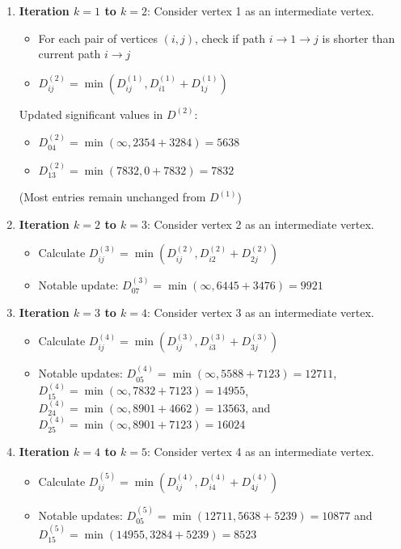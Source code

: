 \documentclass{article}
\theoremstyle{definition}
\begin{document}
\begin{enumerate}
\item \textbf{Iteration $k=1$ to $k=2$}: Consider vertex 1 as an intermediate vertex.
   \begin{itemize}
   \item For each pair of vertices $(i,j)$, check if path $i \rightarrow 1 \rightarrow j$ is shorter than current path $i \rightarrow j$
   \item $D^{(2)}_{ij} = \min(D^{(1)}_{ij}, D^{(1)}_{i1} + D^{(1)}_{1j})$
   \end{itemize}

   Updated significant values in $D^{(2)}$:
   \begin{itemize}
   \item $D^{(2)}_{04} = \min(\infty, 2354 + 3284) = 5638$
   \item $D^{(2)}_{13} = \min(7832, 0 + 7832) = 7832$
   \end{itemize}
   (Most entries remain unchanged from $D^{(1)}$)

\item \textbf{Iteration $k=2$ to $k=3$}: Consider vertex 2 as an intermediate vertex.
   \begin{itemize}
   \item Calculate $D^{(3)}_{ij} = \min(D^{(2)}_{ij}, D^{(2)}_{i2} + D^{(2)}_{2j})$
   \item Notable update: $D^{(3)}_{07} = \min(\infty, 6445 + 3476) = 9921$
   \end{itemize}

\item \textbf{Iteration $k=3$ to $k=4$}: Consider vertex 3 as an intermediate vertex.
   \begin{itemize}
   \item Calculate $D^{(4)}_{ij} = \min(D^{(3)}_{ij}, D^{(3)}_{i3} + D^{(3)}_{3j})$
   \item Notable updates: $D^{(4)}_{05} = \min(\infty, 5588 + 7123) = 12711$, $D^{(4)}_{15} = \min(\infty, 7832 + 7123) = 14955$, $D^{(4)}_{24} = \min(\infty, 8901 + 4662) = 13563$, and $D^{(4)}_{25} = \min(\infty, 8901 + 7123) = 16024$
   \end{itemize}

\item \textbf{Iteration $k=4$ to $k=5$}: Consider vertex 4 as an intermediate vertex.
   \begin{itemize}
   \item Calculate $D^{(5)}_{ij} = \min(D^{(4)}_{ij}, D^{(4)}_{i4} + D^{(4)}_{4j})$
   \item Notable updates: $D^{(5)}_{05} = \min(12711, 5638 + 5239) = 10877$ and $D^{(5)}_{15} = \min(14955, 3284 + 5239) = 8523$
   \end{itemize}


\end{enumerate}
\end{document}
